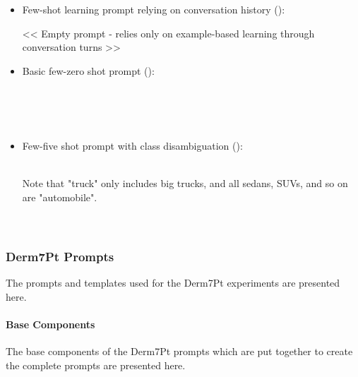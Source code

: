 \documentclass[../ShajiS_RnDReport.tex]{subfiles}
\begin{document}
\begin{itemize}
    \item Few-shot learning prompt relying on conversation history ():
    \begin{promptbox}
    << Empty prompt - relies only on example-based learning through conversation turns >>
    \end{promptbox}

    \item Basic few-zero shot prompt ():
    \begin{promptbox}
     \\
     \\
     \\
    \end{promptbox}

    \item Few-five shot prompt with class disambiguation ():
    \begin{promptbox}
     \\
    Note that "truck" only includes big trucks, and all sedans, SUVs, and so on are "automobile". \\
     \\
     \\
    \end{promptbox}
\end{itemize}

\subsubsection{Derm7Pt Prompts}
\label{sec:appendix:prompts:derm}
The prompts and templates used for the Derm7Pt experiments are presented here.

\paragraph{Base Components}
\label{sec:appendix:prompts:derm:base}
The base components of the Derm7Pt prompts which are put together to create the complete prompts are presented here.
\end{document}
